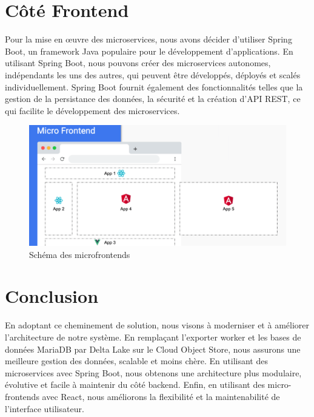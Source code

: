 \section{Côté Frontend}
Pour la mise en œuvre des microservices, nous avons décider d'utiliser Spring Boot, un framework Java populaire pour le développement d'applications. En utilisant Spring Boot, nous pouvons créer des microservices autonomes, indépendants les uns des autres, qui peuvent être développés, déployés et scalés individuellement. Spring Boot fournit également des fonctionnalités telles que la gestion de la persistance des données, la sécurité et la création d'API REST, ce qui facilite le développement des microservices.

\begin{figure}[H]
\centering
\includegraphics[width=\linewidth]{images/microfrontends.png}
\caption{Schéma des microfrontends}\label{fig:schema-microfrontends}
\end{figure}

\section*{Conclusion}

En adoptant ce cheminement de solution, nous visons à moderniser et à améliorer l'architecture de notre système. En remplaçant l'exporter worker et les bases de données MariaDB par Delta Lake sur le Cloud Object Store, nous assurons une meilleure gestion des données, scalable et moins chère. En utilisant des microservices avec Spring Boot, nous obtenons une architecture plus modulaire, évolutive et facile à maintenir du côté backend. Enfin, en utilisant des micro-frontends avec React, nous améliorons la flexibilité et la maintenabilité de l'interface utilisateur.